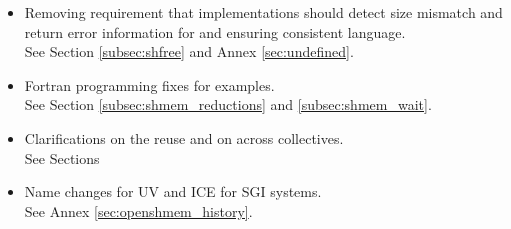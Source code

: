 \begin{itemize}
\item Removing requirement that implementations should detect size mismatch and return error information for  and ensuring consistent language.\\See Section \ref{subsec:shfree} and Annex \ref{sec:undefined}. 
\item Fortran programming fixes for examples.\\ See Section \ref{subsec:shmem_reductions} and \ref{subsec:shmem_wait}. 
\item Clarifications on the reuse  and  on across collectives.\\See Sections 
\item Name changes for UV and ICE for SGI systems.\\See Annex \ref{sec:openshmem_history}. 
\end{itemize}
